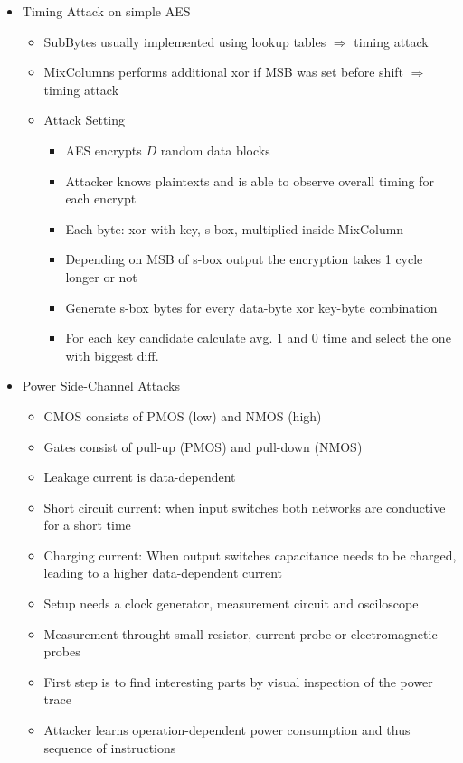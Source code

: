\documentclass[11pt, paper=a4, twocolumn]{scrartcl}
\begin{document}
\begin{itemize}
\begin{itemize}
				\end{itemize}
			\item Timing Attack on simple AES
				\begin{itemize}
					\item SubBytes usually implemented using lookup tables $\Rightarrow$ timing attack
					\item MixColumns performs additional xor if MSB was set before shift $\Rightarrow$ timing attack
					\item Attack Setting
						\begin{itemize}
							\item AES encrypts $D$ random data blocks
							\item Attacker knows plaintexts and is able to observe overall timing for each encrypt
							\item Each byte: xor with key, s-box, multiplied inside MixColumn
							\item Depending on MSB of s-box output the encryption takes 1 cycle longer or not
							\item Generate s-box bytes for every data-byte xor key-byte combination
							\item For each key candidate calculate avg. 1 and 0 time and select the one with biggest diff.
						\end{itemize}
				\end{itemize}
			\item Power Side-Channel Attacks
				\begin{itemize}
					\item CMOS consists of PMOS (low) and NMOS (high)
					\item Gates consist of pull-up (PMOS) and pull-down (NMOS)
					\item Leakage current is data-dependent
					\item Short circuit current: when input switches both networks are conductive for a short time
					\item Charging current: When output switches capacitance needs to be charged, leading to a higher data-dependent 
						current
					\item Setup needs a clock generator, measurement circuit and osciloscope
					\item Measurement throught small resistor, current probe or electromagnetic probes
					\item First step is to find interesting parts by visual inspection of the power trace
					\item Attacker learns operation-dependent power consumption and thus sequence of instructions

\end{itemize}
\end{itemize}
\end{document}
